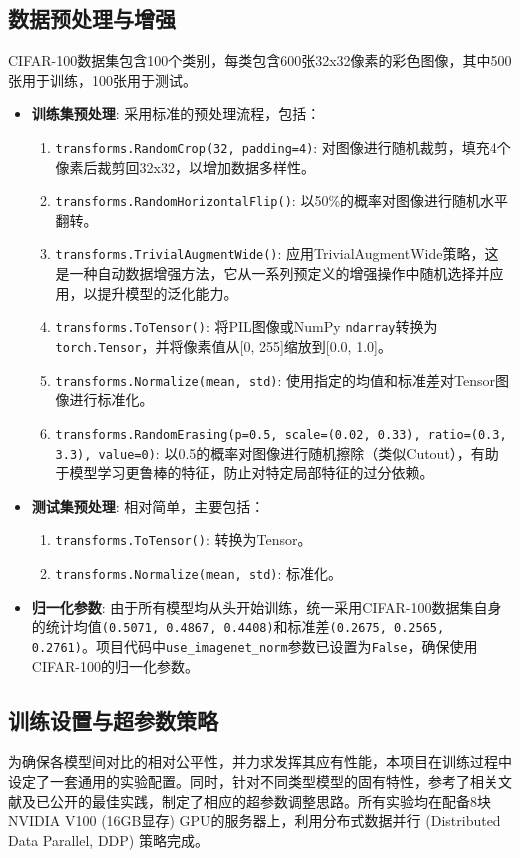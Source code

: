 \documentclass[a4paper]{article}
\begin{document}
\subsection{数据预处理与增强}
CIFAR-100数据集包含100个类别，每类包含600张32x32像素的彩色图像，其中500张用于训练，100张用于测试。
\begin{itemize}
    \item \textbf{训练集预处理}: 采用标准的预处理流程，包括：
    \begin{enumerate}
        \item \texttt{transforms.RandomCrop(32, padding=4)}: 对图像进行随机裁剪，填充4个像素后裁剪回32x32，以增加数据多样性。
        \item \texttt{transforms.RandomHorizontalFlip()}: 以50\%的概率对图像进行随机水平翻转。
        \item \texttt{transforms.TrivialAugmentWide()}: 应用TrivialAugmentWide策略，这是一种自动数据增强方法，它从一系列预定义的增强操作中随机选择并应用，以提升模型的泛化能力。
        \item \texttt{transforms.ToTensor()}: 将PIL图像或NumPy \texttt{ndarray}转换为\texttt{torch.Tensor}，并将像素值从[0, 255]缩放到[0.0, 1.0]。
        \item \texttt{transforms.Normalize(mean, std)}: 使用指定的均值和标准差对Tensor图像进行标准化。
        \item \texttt{transforms.RandomErasing(p=0.5, scale=(0.02, 0.33), ratio=(0.3, 3.3), value=0)}: 以0.5的概率对图像进行随机擦除（类似Cutout），有助于模型学习更鲁棒的特征，防止对特定局部特征的过分依赖。
    \end{enumerate}
    \item \textbf{测试集预处理}: 相对简单，主要包括：
    \begin{enumerate}
        \item \texttt{transforms.ToTensor()}: 转换为Tensor。
        \item \texttt{transforms.Normalize(mean, std)}: 标准化。
    \end{enumerate}
    \item \textbf{归一化参数}: 由于所有模型均从头开始训练，统一采用CIFAR-100数据集自身的统计均值\texttt{(0.5071, 0.4867, 0.4408)}和标准差\texttt{(0.2675, 0.2565, 0.2761)}。项目代码中\texttt{use\_imagenet\_norm}参数已设置为\texttt{False}，确保使用CIFAR-100的归一化参数。
\end{itemize}

\subsection{训练设置与超参数策略}
为确保各模型间对比的相对公平性，并力求发挥其应有性能，本项目在训练过程中设定了一套通用的实验配置。同时，针对不同类型模型的固有特性，参考了相关文献及已公开的最佳实践，制定了相应的超参数调整思路。所有实验均在配备8块NVIDIA V100 (16GB显存) GPU的服务器上，利用分布式数据并行 (Distributed Data Parallel, DDP) 策略完成。
\end{document}
